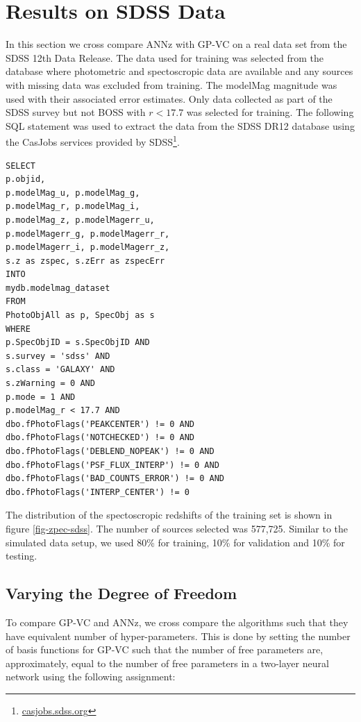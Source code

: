 \documentclass[useAMS,usenatbib,fleqn]{mn2e}
\begin{document}
\section{Results on SDSS Data}
\label{sec-experiments-sdss}

In this section we cross compare {\sc ANNz} with GP-VC on a real data set from the SDSS 12th Data Release. The data used for training was selected from the database where photometric and spectoscropic data are available and any sources with missing data was excluded from training. The {\selectfont modelMag} magnitude was used with their associated error estimates. Only data collected as part of the SDSS survey but not BOSS with $r<17.7$ was selected for training. The following SQL statement was used to extract the data from the SDSS DR12 database using the CasJobs services provided by SDSS\footnote{\url{casjobs.sdss.org}}.

\begin{verbatim}
SELECT
p.objid,
p.modelMag_u, p.modelMag_g,
p.modelMag_r, p.modelMag_i,
p.modelMag_z, p.modelMagerr_u,
p.modelMagerr_g, p.modelMagerr_r,
p.modelMagerr_i, p.modelMagerr_z,
s.z as zspec, s.zErr as zspecErr
INTO
mydb.modelmag_dataset
FROM
PhotoObjAll as p, SpecObj as s
WHERE
p.SpecObjID = s.SpecObjID AND
s.survey = 'sdss' AND
s.class = 'GALAXY' AND 
s.zWarning = 0 AND
p.mode = 1 AND
p.modelMag_r < 17.7 AND
dbo.fPhotoFlags('PEAKCENTER') != 0 AND
dbo.fPhotoFlags('NOTCHECKED') != 0 AND
dbo.fPhotoFlags('DEBLEND_NOPEAK') != 0 AND
dbo.fPhotoFlags('PSF_FLUX_INTERP') != 0 AND
dbo.fPhotoFlags('BAD_COUNTS_ERROR') != 0 AND
dbo.fPhotoFlags('INTERP_CENTER') != 0
\end{verbatim}

The distribution of the spectoscropic redshifts of the training set is shown in figure \ref{fig-zpec-sdss}. The number of sources selected was 577,725. Similar to the simulated data setup, we used 80\% for training, 10\% for validation and 10\% for testing.


\subsection{Varying the Degree of Freedom}

To compare GP-VC and {\sc ANNz}, we cross compare the algorithms such that they have equivalent number of hyper-parameters. This is done by setting the number of basis functions for GP-VC such that the number of free parameters are, approximately, equal to the number of free parameters in a two-layer neural network using the following assignment:
\end{document}
